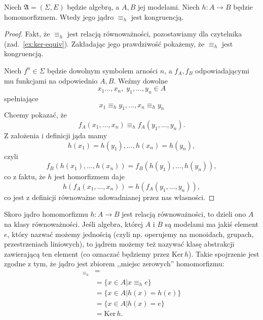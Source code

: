 \begin{lemma}
	Niech $\mathfrak{A} = (\Sigma, E)$ będzie algebrą, a $A, B$ jej modelami.
	Niech $h: A \to B$ będzie homomorfizmem.
	Wtedy jego jądro $\equiv_h$ jest kongruencją.
\end{lemma}
\begin{proof}
	Fakt,
		że $\equiv_h$ jest relacją równoważności,
		pozostawiamy dla czytelnika (zad.~\ref{ex:ker-equiv}).
	Zakładając jego prawdziwość pokażemy,
		że $\equiv_h$ jest kongruencją.

	Niech $f^n \in \Sigma$ będzie dowolnym symbolem arności $n$,
		a $f_A, f_B$ odpowiadającymi mu funkcjami na odpowiednio $A, B$.
	Weźmy dowolne
	\begin{equation}
		x_1 \dots, x_n,\;y_1, \dots, y_n \in A
	\end{equation}
	spełniające
	\begin{equation}
		x_1 \equiv_h y_1, \dots, x_n \equiv_h y_n
	\end{equation}
	Chcemy pokazać, że
	\begin{equation}
		f_A(x_1, \dots, x_n) \equiv_h f_A(y_1, \dots, y_n).
	\end{equation}
	Z założenia i definicji jąda mamy
	\begin{equation}
		h(x_1) = h(y_1), \dots, h(x_n) = h(y_n),
	\end{equation}
	czyli
	\begin{equation}
		f_B(h(x_1), \dots, h(x_n)) = f_B(h(y_1), \dots, h(y_n)),
	\end{equation}
	co z faktu, że $h$ jest homorfizmem daje
	\begin{equation}
		h(f_A(x_1, \dots, x_n)) = h(f_A(y_1, \dots, y_n)),
	\end{equation}
	co jest z definicji równoważne udowadnianej przez nas własności.
\end{proof}

Skoro jądro homomorfizmu $h: A \to B$ jest relacją równoważności,
	to dzieli ono $A$ na klasy równoważności.
Jeśli algebra,
	której $A$ i $B$ są modelami ma jakiś element $e$,
	który nazwać możemy jednością
	(czyli np. operujemy na monoidach, grupach, przestrzeniach liniowych),
	to jądrem możemy też nazywać klasę abstrakcji zawierającą ten element
	(co oznaczać będziemy przez $\mathrm{Ker}\,h$).
Takie spojrzenie jest zgodne z tym,
	że jądro jest zbiorem ,,miejsc zerowych'' homomorfizmu:
\begin{align}
	[e]_{\equiv_h} &= \\
		&= \{x \in A | x \equiv_h e \} \\
		&= \{x \in A | h(x) = h(e) \} \\
		&= \{x \in A | h(x) = e \}\\
		&= \mathrm{Ker}\,h.
\end{align}

